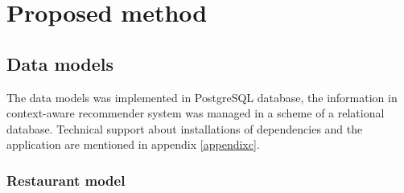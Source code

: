 \chapter{Proposed method}\label{method}

\section{Data models} 

The data models was implemented in PostgreSQL database, 
the information in context-aware recommender system was
managed in a scheme of a relational database. Technical support 
about installations of dependencies and the application are 
mentioned in appendix \ref{appendixc}.

\subsection{Restaurant model} 

